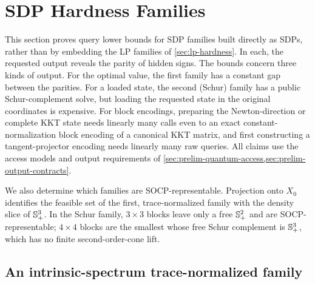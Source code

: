 \section{SDP Hardness Families}
\label{sec:sdp-hardness}

This section proves query lower bounds for SDP families built directly as
SDPs, rather than by embedding the LP families of \cref{sec:lp-hardness}.
In each, the requested output reveals the parity of hidden signs.  The
bounds concern three kinds of output.  For the optimal value, the first
family has a constant gap between the parities.  For a loaded state, the
second (Schur) family has a public Schur-complement solve, but loading the
requested state in the original coordinates is expensive.  For block
encodings, preparing the Newton-direction or complete KKT state needs
linearly many calls even to an exact constant-normalization block encoding
of a canonical KKT matrix, and first constructing a tangent-projector
encoding needs linearly many raw queries.  All claims use
the access models and output requirements of
\cref{sec:prelim-quantum-access,sec:prelim-output-contracts}.

We also determine which families are SOCP-representable.  Projection onto
$X_0$ identifies the feasible set of the first, trace-normalized family with
the density slice of $\mathbb{S}_{+}^3$.
In the Schur family, $3\times3$ blocks leave only a free $\mathbb{S}_{+}^2$ and are
SOCP-representable; $4\times4$ blocks are the
smallest whose free Schur complement is $\mathbb{S}_{+}^3$, which has no finite
second-order-cone lift.

\subsection{An intrinsic-spectrum trace-normalized family}
\label{sec:sdp-intrinsic}

